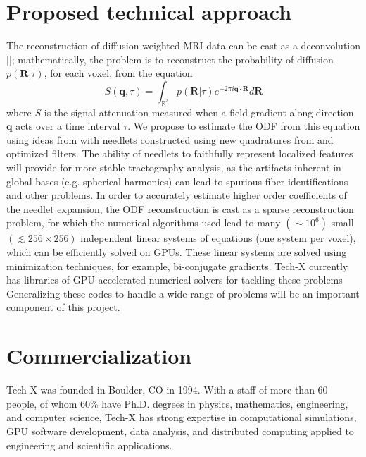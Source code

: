 \documentclass[10pt]{article}
\begin{document}
\section*{Proposed technical approach}
The reconstruction of diffusion weighted MRI data can be cast as a
deconvolution [\cite{Lenglet2008, JIA-VEM-2007}]; mathematically, the problem is
to reconstruct the probability of diffusion $p({\mathbf R}|\tau)$, for each
voxel, from the equation
\begin{equation*}
  S\left({\mathbf q},\tau\right) = \int_{\mathbb{R}^3} p({\mathbf R}|\tau)
e^{-2\pi i {\mathbf q}\cdot {\mathbf R}} d{\mathbf R}
\end{equation*}
where $S$ is the signal attenuation measured when a field gradient along
direction ${\mathbf q}$ acts over a time interval $\tau$.  We propose to
estimate the ODF from this equation using ideas from \cite{KE-NG-PI-2009}
with needlets constructed using new quadratures from \cite{AHR-BEY-2009}
and optimized filters.  The ability of needlets to faithfully represent
localized features will provide for more stable tractography analysis,
as the artifacts inherent in global bases (e.g. spherical harmonics) can
lead to spurious fiber identifications and other problems.  In order to
accurately estimate higher order coefficients of the needlet expansion,
the ODF reconstruction is cast as a sparse reconstruction problem, for
which the numerical algorithms used lead to many $(\sim 10^6)$ small
$(\lesssim 256\times256)$ independent linear systems of equations (one
system per voxel), which can be efficiently solved on GPUs. These linear
systems are solved using minimization techniques, for example,
bi-conjugate gradients. Tech-X currently has libraries of
GPU-accelerated numerical solvers for tackling these problems
Generalizing these codes to handle a wide range of problems will be an
important component of this project.

\section*{Commercialization}
Tech-X was founded in Boulder, CO in 1994. With a staff of more than 60 people,
of whom 60\% have Ph.D. degrees in physics, mathematics, engineering, and
computer science, Tech-X has strong expertise in computational simulations, GPU
software development, data analysis, and distributed computing applied to
engineering and scientific applications.
\end{document}
